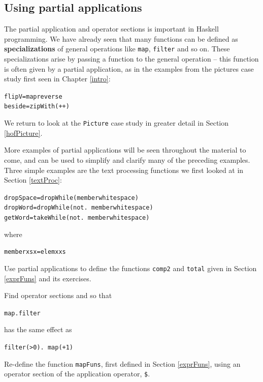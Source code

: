 \subsection*{Using partial applications}

The partial application and operator sections is important in Haskell programming. We have already seen that
many functions can be defined as {\bf specializations} of general operations
like \texttt{map}, \texttt{filter} and so on. These specializations arise by
passing a function to the general operation -- this function is often
given by a partial application, as in the examples from the pictures
case study first seen in Chapter \ref{intro}:
\begin{alltt}
flipV  = map reverse
beside = zipWith (++)
\end{alltt}
We return to look at the \texttt{Picture} case study in greater detail
in Section \ref{hofPicture}.

More examples of partial applications will be seen throughout the material to
come, and can be used to simplify and clarify many of the preceding examples.
Three simple examples are the text processing functions we first looked at in Section \ref{textProc}:
\begin{alltt}
dropSpace = dropWhile (member whitespace)
dropWord  = dropWhile (not .\ member whitespace)
getWord   = takeWhile (not .\ member whitespace)
\end{alltt}
where
\begin{alltt}
member xs x = elem x xs
\end{alltt}
 
\begin{exercises}


\item
Use partial applications to define the functions \texttt{comp2} and
\texttt{total} given in Section \ref{exprFuns} and its exercises.

\item
Find operator sections \texttt{} and
\texttt{} so that
\begin{alltt}
map  . filter 
\end{alltt}
has the same effect as
\begin{alltt}
filter (>0) .\ map (+1)
\end{alltt}


\item
Re-define the function \texttt{mapFuns}, first defined in Section \ref{exprFuns}, using an operator section of the application operator, \texttt{\$}.
\end{exercises}

